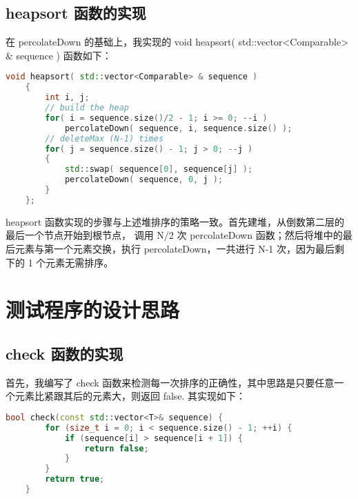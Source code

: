 \documentclass[UTF8]{ctexart}
\begin{document}
\subsection{heapsort 函数的实现}
在 percolateDown 的基础上，我实现的 void heapsort( std::vector<Comparable> \& sequence ) 函数如下：
\begin{lstlisting}[language=c++, breaklines=true, keywordstyle=\color{blue!70}, commentstyle=\color{red!50!green!50!blue!50}, frame=shadowbox, rulesepcolor=\color{red!20!green!20!blue!20}]
    void heapsort( std::vector<Comparable> & sequence )
    {
        int i, j; 
        // build the heap
        for( i = sequence.size()/2 - 1; i >= 0; --i ) 
            percolateDown( sequence, i, sequence.size() );
        // deleteMax (N-1) times
        for( j = sequence.size() - 1; j > 0; --j )
        {
            std::swap( sequence[0], sequence[j] ); 
            percolateDown( sequence, 0, j );
        }
    }; 
\end{lstlisting}

heapsort 函数实现的步骤与上述堆排序的策略一致。首先建堆，从倒数第二层的最后一个节点开始到根节点，
调用 N/2 次 percolateDown 函数；然后将堆中的最后元素与第一个元素交换，执行 percolateDown，一共进行
 N-1 次，因为最后剩下的 1 个元素无需排序。

\section{测试程序的设计思路}
\subsection{check 函数的实现}
首先，我编写了 check 函数来检测每⼀次排序的正确性，其中思路是只要任意一个元素比紧跟其后的元素大，则返回 false. 
其实现如下：
\begin{lstlisting}[language=c++, breaklines=true, keywordstyle=\color{blue!70}, commentstyle=\color{red!50!green!50!blue!50}, frame=shadowbox, rulesepcolor=\color{red!20!green!20!blue!20}]
    bool check(const std::vector<T>& sequence) {
        for (size_t i = 0; i < sequence.size() - 1; ++i) {
            if (sequence[i] > sequence[i + 1]) {
                return false;
            }
        }
        return true;
    }
\end{lstlisting}
\end{document}
